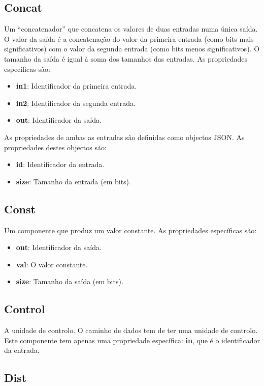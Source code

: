 \documentclass[11pt,a4paper,twoside,titlepage]{report}
\begin{document}
\subsection{Concat}

Um ``concatenador'' que concatena os valores de duas entradas numa única saída.
O valor da saída é a concatenação do valor da primeira entrada (como bits mais
significativos) com o valor da segunda entrada (como bits menos significativos).
O tamanho da saída é igual à soma dos tamanhos das entradas.
As propriedades específicas são:
\begin{itemize}
	\item \textbf{in1}: Identificador da primeira entrada.
	\item \textbf{in2}: Identificador da segunda entrada.
	\item \textbf{out}: Identificador da saída.
\end{itemize}

As propriedades de ambas as entradas são definidas como objectos JSON. As
propriedades destes objectos são:
\begin{itemize}
	\item \textbf{id}: Identificador da entrada.
	\item \textbf{size}: Tamanho da entrada (em bits).
\end{itemize}

\subsection{Const}

Um componente que produz um valor constante. As propriedades específicas são:
\begin{itemize}
	\item \textbf{out}: Identificador da saída.
	\item \textbf{val}: O valor constante.
	\item \textbf{size}: Tamanho da saída (em bits).
\end{itemize}

\subsection{Control}

A unidade de controlo. O caminho de dados tem de ter uma unidade de controlo.
Este componente tem apenas uma propriedade específica: \textbf{in}, que é o
identificador da entrada.

\subsection{Dist}
\end{document}
